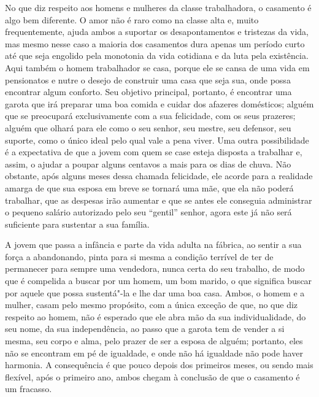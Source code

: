 No que diz respeito aos homens e mulheres da classe trabalhadora, o
casamento é algo bem diferente. O amor não é raro como na classe alta e,
muito frequentemente, ajuda ambos a suportar os desapontamentos e
tristezas da vida, mas mesmo nesse caso a maioria dos casamentos dura
apenas um período curto até que seja engolido pela monotonia da vida
cotidiana e da luta pela existência. Aqui também o homem trabalhador se
casa, porque ele se cansa de uma vida em pensionatos e nutre o desejo de
construir uma casa que seja sua, onde possa encontrar algum conforto.
Seu objetivo principal, portanto, é encontrar uma garota que irá
preparar uma boa comida e cuidar dos afazeres domésticos; alguém que se
preocupará exclusivamente com a sua felicidade, com os seus prazeres;
alguém que olhará para ele como o seu senhor, seu mestre, seu defensor,
seu suporte, como o único ideal pelo qual vale a pena viver. Uma outra
possibilidade é a expectativa de que a jovem com quem se case esteja
disposta a trabalhar e, assim, o ajudar a poupar alguns centavos a mais
para os dias de chuva. Não obstante, após alguns meses dessa chamada
felicidade, ele acorde para a realidade amarga de que sua esposa em
breve se tornará uma mãe, que ela não poderá trabalhar, que as despesas
irão aumentar e que se antes ele conseguia administrar o pequeno salário
autorizado pelo seu ``gentil'' senhor, agora este já não será suficiente
para sustentar a sua família.

A jovem que passa a infância e parte da vida adulta na fábrica, ao
sentir a sua força a abandonando, pinta para si mesma a condição
terrível de ter de permanecer para sempre uma vendedora, nunca certa do
seu trabalho, de modo que é compelida a buscar por um homem, um bom
marido, o que significa buscar por aquele que possa sustentá"-la e lhe
dar uma boa casa. Ambos, o homem e a mulher, casam pelo mesmo propósito,
com a única exceção de que, no que diz respeito ao homem, não é esperado
que ele abra mão da sua individualidade, do seu nome, da sua
independência, ao passo que a garota tem de vender a si mesma, seu corpo
e alma, pelo prazer de ser a esposa de alguém; portanto, eles não se
encontram em pé de igualdade, e onde não há igualdade não pode haver
harmonia. A consequência é que pouco depois dos primeiros meses, ou
sendo mais flexível, após o primeiro ano, ambos chegam à conclusão de
que o casamento é um fracasso.

